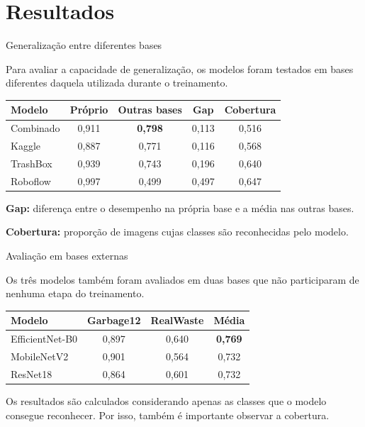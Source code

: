 \section{Resultados}


\begin{frame}{Generalização entre diferentes bases}
	
	\small
	Para avaliar a capacidade de generalização, os modelos
	foram testados em bases diferentes daquela utilizada
	durante o treinamento.
	
	\vspace{0.3cm}
	
	\centering
	\begin{tabular}{lcccc}
		\toprule
		\textbf{Modelo} &
		\textbf{Próprio} &
		\textbf{Outras bases} &
		\textbf{Gap} &
		\textbf{Cobertura} \\
		\midrule
		Combinado & 0,911 & \textbf{0,798} & 0,113 & 0,516 \\
		Kaggle    & 0,887 & 0,771 & 0,116 & 0,568 \\
		TrashBox  & 0,939 & 0,743 & 0,196 & 0,640 \\
		Roboflow  & 0,997 & 0,499 & 0,497 & 0,647 \\
		\bottomrule
	\end{tabular}
	
	\vspace{0.4cm}

	\footnotesize
	\textbf{Gap:} diferença entre o desempenho na própria base e a
	média nas outras bases. 
	
	\textbf{Cobertura:} proporção de imagens
	cujas classes são reconhecidas pelo modelo.
	
\end{frame}

\begin{frame}{Avaliação em bases externas}
	
	Os três modelos também foram avaliados em duas bases
	que não participaram de nenhuma etapa do treinamento.
	
	\vspace{0.35cm}
	
	\centering
	\begin{tabular}{lccc}
		\toprule
		\textbf{Modelo} &
		\textbf{Garbage12} &
		\textbf{RealWaste} &
		\textbf{Média} \\
		\midrule
		EfficientNet-B0 & 0,897 & 0,640 & \textbf{0,769} \\
		MobileNetV2     & 0,901 & 0,564 & 0,732 \\
		ResNet18        & 0,864 & 0,601 & 0,732 \\
		\bottomrule
	\end{tabular}
	
	\vspace{0.4cm}
	
	\footnotesize
	Os resultados são calculados considerando apenas as
	classes que o modelo consegue reconhecer. Por isso,
	também é importante observar a cobertura.
	
\end{frame}





